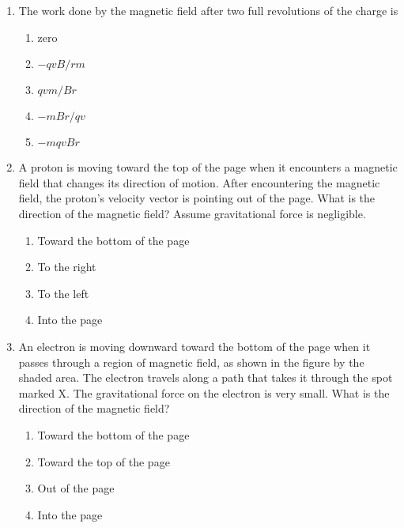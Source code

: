 \documentclass{../../oss-apphys}
\begin{document}
\begin{multicols}{2}
\begin{enumerate}[leftmargin=18pt,resume]
  \item The work done by the magnetic field after two full revolutions of the
    charge is
    \begin{enumerate}[noitemsep,topsep=0pt,leftmargin=18pt,label=(\Alph*)]
    \item zero
    \item $-qvB/rm$
    \item $qvm/Br$
    \item $-mBr/qv$
    \item $-mqvBr$
    \end{enumerate}
    
  \item A proton is moving toward the top of the page when it encounters a
    magnetic field that changes its direction of motion. After encountering
    the magnetic field, the proton's velocity vector is pointing out of the
    page. What is the direction of the magnetic field? Assume gravitational
    force is negligible.
    \begin{enumerate}[noitemsep,topsep=0pt,leftmargin=18pt,label=(\Alph*)]
    \item Toward the bottom of the page
    \item To the right
    \item To the left
    \item Into the page
    \end{enumerate}

    \columnbreak
    
  \item An electron is moving downward toward the bottom of the page when it
    passes through a region of magnetic field, as shown in the figure by the
    shaded area. The electron travels along a path that takes it through the
    spot marked X. The gravitational force on the electron is very small. What
    is the direction of the magnetic field?

    \begin{center}
    \end{center}
    \begin{enumerate}[noitemsep,topsep=0pt,leftmargin=18pt,label=(\Alph*)]
    \item Toward the bottom of the page
    \item Toward the top of the page
    \item Out of the page
    \item Into the page
    \end{enumerate}
  \end{enumerate}


\end{multicols}
\end{document}
